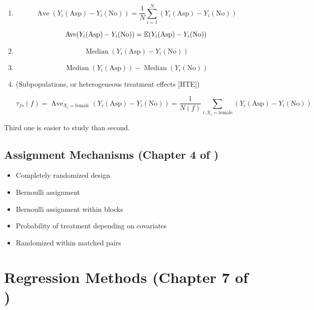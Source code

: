 \begin{enumerate}

\item

\[
\operatorname{Ave}(Y_i(\text{Asp}) - Y_i(\text{No})) = \frac{1}{N} \sum_{i=1}^N (Y_i(\text{Asp}) - Y_i(\text{No})) 
\]

\[
\operatorname{Ave}(Y_i(\text{Asp}) - Y_i(\text{No})) = \E (Y_i(\text{Asp}) - Y_i(\text{No})) 
\]

\item 

\[
\operatorname{Median}(Y_i(\text{Asp}) - Y_i(\text{No})) 
\]

\item 

\[
\operatorname{Median}(Y_i(\text{Asp})) - \operatorname{Median}(Y_i(\text{No})) 
\]

\item (Subpopulations, or heterogeneous treatment effects [HTE])

\[
\tau_{fs}(f) = \operatorname{Ave}_{X_i = \text{female}}(Y_i(\text{Asp}) - Y_i(\text{No})) = \frac{1}{N(f)} \sum_{i:X_i = \text{female}} (Y_i(\text{Asp}) - Y_i(\text{No})) 
\]


\end{enumerate}

Third one is easier to study than second.

\subsection{Assignment Mechanisms (Chapter 4 of \citet{imbens_rubin_2015})}

\begin{itemize}

\item Completely randomized design

\item Bernoulli assignment

\item Bernoulli assignment within blocks

\item Probability of treatment depending on covariates

\item Randomized within matched pairs

\end{itemize}

\section{Regression Methods (Chapter 7 of \citet{imbens_rubin_2015})}

